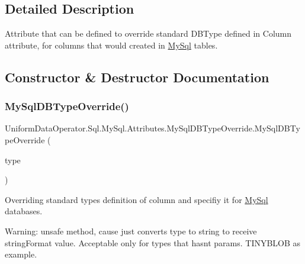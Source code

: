 \subsection{Detailed Description}
Attribute that can be defined to override standard D\+B\+Type defined in Column attribute, for columns that would created in \mbox{\hyperlink{namespace_uniform_data_operator_1_1_sql_1_1_my_sql}{My\+Sql}} tables. 



\subsection{Constructor \& Destructor Documentation}
\mbox{\label{class_uniform_data_operator_1_1_sql_1_1_my_sql_1_1_attributes_1_1_my_sql_d_b_type_override_aa560e25692613f1a6860f8991dc18a66}} 
\subsubsection{\texorpdfstring{My\+Sql\+D\+B\+Type\+Override()}{MySqlDBTypeOverride()}\hspace{0.1cm}{\footnotesize\ttfamily [1/2]}}
{\footnotesize\ttfamily Uniform\+Data\+Operator.\+Sql.\+My\+Sql.\+Attributes.\+My\+Sql\+D\+B\+Type\+Override.\+My\+Sql\+D\+B\+Type\+Override (\begin{DoxyParamCaption}\item[{My\+Sql\+Db\+Type}]{type }\end{DoxyParamCaption})}



Overriding standard type\textquotesingle{}s definition of column and specifiy it for \mbox{\hyperlink{namespace_uniform_data_operator_1_1_sql_1_1_my_sql}{My\+Sql}} databases. 

Warning\+: unsafe method, cause just converts type to string to receive string\+Format value. Acceptable only for types that hasn\textquotesingle{}t params. T\+I\+N\+Y\+B\+L\+OB as example. 


